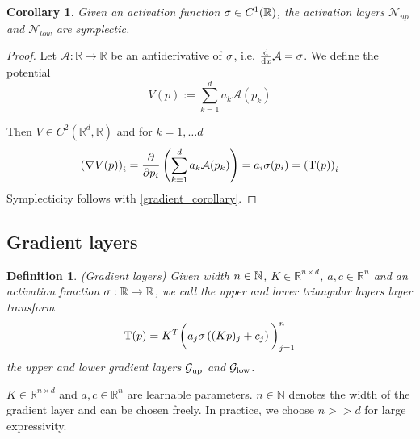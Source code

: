 \documentclass[twoside,a4paper]{article}
\newtheorem{definition}{Definition}
\newtheorem{corollary}{Corollary}
\begin{document}
\begin{corollary}
	Given an activation function $\sigma \in C^1(\mathbb{R})$,
	the activation layers $\mathcal{N}_{up}$ and $\mathcal{N}_{low}$ are symplectic.
\end{corollary}
\begin{proof}
	Let $\mathcal{A}: \mathbb{R} \to \mathbb{R}$ be an antiderivative of $\sigma$, 
	i.e. $\frac{\mathrm{d}^{}}{\mathrm{d}x} \mathcal{A} = \sigma$. We define the potential
	\begin{equation*}
		V(p) := \sum_{k=1}^d a_k \mathcal{A}(p_k)
	\end{equation*}

	Then $V \in C^2(\mathbb{R}^d, \mathbb{R})$ and for $k=1, \dots d$
	\begin{equation*}
		\left( \nabla_{}{V}(p) \right)_i = \frac{\partial }{\partial p_i} \left( \sum_{k=1}^d a_k \mathcal{A}(p_k) \right)
		= a_i \sigma(p_i) = \left( \mathrm{T}(p) \right)_i
	\end{equation*}
	Symplecticity follows with \cref{gradient_corollary}.
\end{proof}

\subsection{Gradient layers}

\begin{definition}
	(Gradient layers)
	Given width $n \in \mathbb{N}$, $K \in \mathbb{R}^{n \times d}$, $a,c \in \mathbb{R}^n$ and
	an activation function $\sigma : \mathbb{R} \to \mathbb{R}$,
	we call the upper and lower triangular layers layer transform
	\begin{equation*}
		\mathrm{T}(p) = K^T \bigg( a_j \sigma \left( (Kp)_j + c_j \right) \bigg)_{j=1}^n
	\end{equation*}
	the upper and lower gradient layers $\mathcal{G}_{\text{up}}$ and $\mathcal{G}_{\text{low}}$.
\end{definition}
$K \in \mathbb{R}^{n \times d}$ and $a,c \in \mathbb{R}^n$
are learnable parameters. 
$n \in \mathbb{N}$ denotes the width of the gradient layer and can be chosen freely.
In practice, we choose $n >> d$ for large expressivity.
\end{document}
